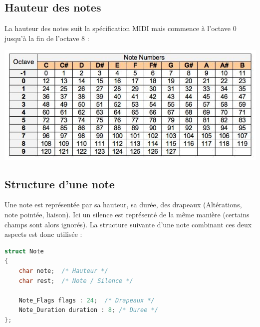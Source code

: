 \documentclass[12pt]{report}
\begin{document}
\subsection{Hauteur des notes}
La hauteur des notes suit la spécification MIDI mais commence à l'octave 0 jusqu'à la fin de l'octave 8 : \\
\begin{center}
\includegraphics[scale=0.50]{midi.jpg}
\end{center}
\vskip 0.3in
\subsection{Structure d'une note}
Une note est représentée par sa hauteur, sa durée, des drapeaux (Altérations, note pointée, liaison). Ici un silence est représenté de la même manière
(certains champs sont alors ignorés). La structure suivante d'une note combinant ces deux aspects est donc utilisée :\\
\lstset{style=CLangage}
\begin{lstlisting}[language=C]
struct Note
{
	char note; 	/* Hauteur */
	char rest; 	/* Note / Silence */
	
	Note_Flags flags : 24;	/* Drapeaux */
	Note_Duration duration : 8;	/* Duree */
};
\end{lstlisting}
\end{document}
